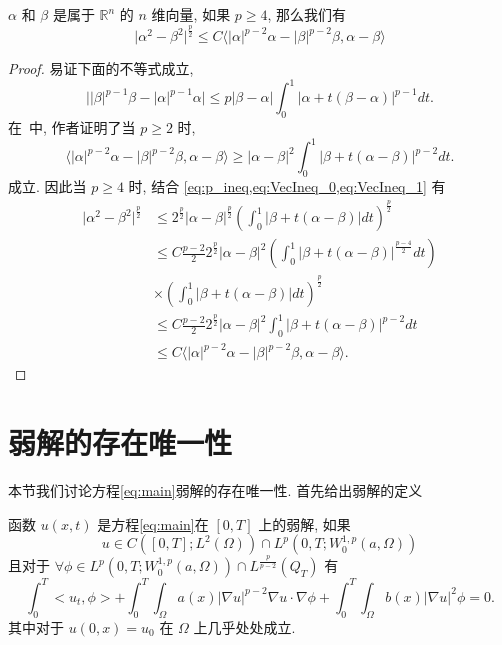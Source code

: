 \documentclass[oneside,longtitle]{LZUthesis}
\numberwithin{equation}{chapter}
\newcommand*\abs[1]{\lvert#1\rvert}
\newcommand\R{\mathbb{R}}
\begin{document}
\begin{lemma}\label{lem:VecIneq}
	$\alpha$ 和 $\beta$ 是属于 $\R^{n}$ 的 $n$ 维向量, 如果 $p \geq 4$, 那么我们有
	\begin{equation*}
		\abs{\alpha^2 - \beta^2}^{\frac{p}{2}}
		\leq C \langle \abs{\alpha}^{p-2}\alpha - \abs{\beta}^{p-2}\beta, \alpha-\beta\rangle
	\end{equation*}
\end{lemma}
\begin{proof}
	易证下面的不等式成立,
	\begin{equation}\label{eq:VecIneq_0}
		\abs{\abs{\beta}^{p-1}\beta - \abs{\alpha}^{p-1}\alpha} \leq p\abs{\beta-\alpha}\int_0^1 \abs{\alpha + t(\beta - \alpha)}^{p-1}dt.
	\end{equation}
	在~\cite{lindqvistNotesStationaryPLaplace2019}中, 作者证明了当 $p \geq 2$ 时, 
	\begin{equation}\label{eq:VecIneq_1}
		\langle \abs{\alpha}^{p-2}\alpha - \abs{\beta}^{p-2}\beta, \alpha-\beta\rangle
		\geq \abs{\alpha-\beta}^2\int_0^1 \abs{\beta + t(\alpha - \beta)}^{p-2}dt.
	\end{equation}
	成立.
	因此当 $p \geq 4$ 时, 结合 \cref{eq:p_ineq,eq:VecIneq_0,eq:VecIneq_1} 有
	\begin{equation*}
		\begin{split}
			\abs{\alpha^2 - \beta^2}^{\frac{p}{2}}
			&\leq 2^{\frac{p}{2}}\abs{\alpha-\beta}^{\frac{p}{2}}
			\left(\int_0^1 \abs{\beta + t(\alpha - \beta)}dt\right)^{\frac{p}{2}}\\
			&\leq C\frac{p-2}{2}2^{\frac{p}{2}}\abs{\alpha-\beta}^2
			\left(\int_0^1 \abs{\beta + t(\alpha - \beta)}^{\frac{p-4}{2}}dt\right)\\
			&\times\left(\int_0^1 \abs{\beta + t(\alpha - \beta)}dt\right)^{\frac{p}{2}}\\
			&\leq C\frac{p-2}{2}2^{\frac{p}{2}}\abs{\alpha-\beta}^2
			\int_0^1 \abs{\beta + t(\alpha - \beta)}^{p-2}dt\\
			&\leq C \langle \abs{\alpha}^{p-2}\alpha - \abs{\beta}^{p-2}\beta, \alpha-\beta\rangle.
		\end{split}
	\end{equation*}
\end{proof}

\section{弱解的存在唯一性}
本节我们讨论方程\eqref{eq:main}弱解的存在唯一性. 首先给出弱解的定义
\begin{definition}
	函数 $u(x, t)$ 是方程\eqref{eq:main}在 $[0, T]$ 上的弱解, 如果
	\begin{equation*}
		u \in C([0, T]; L^2(\Omega))\cap L^p(0, T; W_0^{1,p}(a,\Omega))
	\end{equation*}
	且对于 $\forall \phi \in L^p(0, T; W_0^{1,p}(a,\Omega))\cap L^{\frac{p}{p-2}}(Q_T)$ 有
	\begin{equation*}
		\int_0^T <u_t, \phi> + \int_0^T\int_\Omega a(x)\abs{\nabla u}^{p - 2}\nabla u \cdot \nabla \phi
		+ \int_0^T\int_\Omega b(x)\abs{\nabla u}^2\phi = 0.
	\end{equation*}
	其中对于 $u(0, x) = u_0$ 在 $\Omega$ 上几乎处处成立.
\end{definition}
\end{document}
